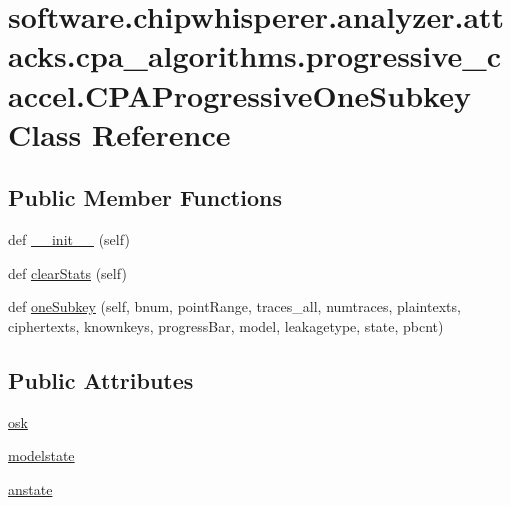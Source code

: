 \hypertarget{classsoftware_1_1chipwhisperer_1_1analyzer_1_1attacks_1_1cpa__algorithms_1_1progressive__caccel_1_1CPAProgressiveOneSubkey}{}\section{software.\+chipwhisperer.\+analyzer.\+attacks.\+cpa\+\_\+algorithms.\+progressive\+\_\+caccel.\+C\+P\+A\+Progressive\+One\+Subkey Class Reference}
\label{classsoftware_1_1chipwhisperer_1_1analyzer_1_1attacks_1_1cpa__algorithms_1_1progressive__caccel_1_1CPAProgressiveOneSubkey}
\subsection*{Public Member Functions}
\begin{DoxyCompactItemize}
\item 
def \hyperlink{classsoftware_1_1chipwhisperer_1_1analyzer_1_1attacks_1_1cpa__algorithms_1_1progressive__caccel_1_1CPAProgressiveOneSubkey_a21d453abeff12aeda80c313bea01102d}{\+\_\+\+\_\+init\+\_\+\+\_\+} (self)
\item 
def \hyperlink{classsoftware_1_1chipwhisperer_1_1analyzer_1_1attacks_1_1cpa__algorithms_1_1progressive__caccel_1_1CPAProgressiveOneSubkey_a569832a507f649c940b07b647f2b68ed}{clear\+Stats} (self)
\item 
def \hyperlink{classsoftware_1_1chipwhisperer_1_1analyzer_1_1attacks_1_1cpa__algorithms_1_1progressive__caccel_1_1CPAProgressiveOneSubkey_ad88b51e42fb1d061437ade35b957699a}{one\+Subkey} (self, bnum, point\+Range, traces\+\_\+all, numtraces, plaintexts, ciphertexts, knownkeys, progress\+Bar, model, leakagetype, state, pbcnt)
\end{DoxyCompactItemize}
\subsection*{Public Attributes}
\begin{DoxyCompactItemize}
\item 
\hyperlink{classsoftware_1_1chipwhisperer_1_1analyzer_1_1attacks_1_1cpa__algorithms_1_1progressive__caccel_1_1CPAProgressiveOneSubkey_a76d4f5791241c0a5c7b7dda5fc0da0d8}{osk}
\item 
\hyperlink{classsoftware_1_1chipwhisperer_1_1analyzer_1_1attacks_1_1cpa__algorithms_1_1progressive__caccel_1_1CPAProgressiveOneSubkey_ad6062fd8c82b37a9b006fcb6f3b589a6}{modelstate}
\item 
\hyperlink{classsoftware_1_1chipwhisperer_1_1analyzer_1_1attacks_1_1cpa__algorithms_1_1progressive__caccel_1_1CPAProgressiveOneSubkey_abc94b14ea5f680c42544cc571fa392ae}{anstate}
\end{DoxyCompactItemize}


